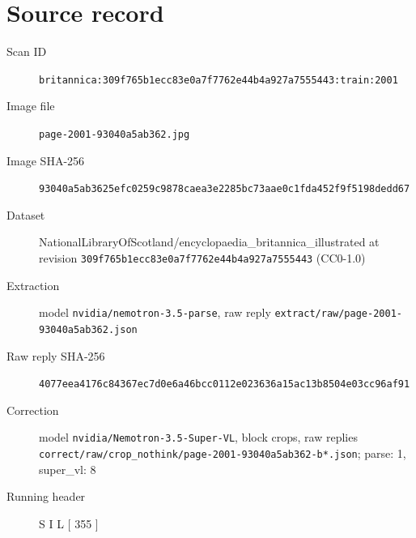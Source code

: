 \documentclass{article}
\begin{document}
\section*{Source record}
\begin{description}
\item[Scan ID] \texttt{britannica:309f765b1ecc83e0a7f7762e44b4a927a7555443:train:2001}
\item[Image file] \texttt{page-2001-93040a5ab362.jpg}
\item[Image SHA-256] \texttt{93040a5ab3625efc0259c9878caea3e2285bc73aae0c1fda452f9f5198dedd67}
\item[Dataset] NationalLibraryOfScotland/encyclopaedia\_britannica\_illustrated at revision \texttt{309f765b1ecc83e0a7f7762e44b4a927a7555443} (CC0-1.0)
\item[Extraction] model \texttt{nvidia/nemotron-3.5-parse}, raw reply \texttt{extract/raw/page-2001-93040a5ab362.json}
\item[Raw reply SHA-256] \texttt{4077eea4176c84367ec7d0e6a46bcc0112e023636a15ac13b8504e03cc96af91}
\item[Correction] model \texttt{nvidia/Nemotron-3.5-Super-VL}, block crops, raw replies \texttt{correct/raw/crop\_nothink/page-2001-93040a5ab362-b*.json}; parse: 1, super\_vl: 8
\item[Running header] S I L [ 355 ]
\end{description}
\end{document}
